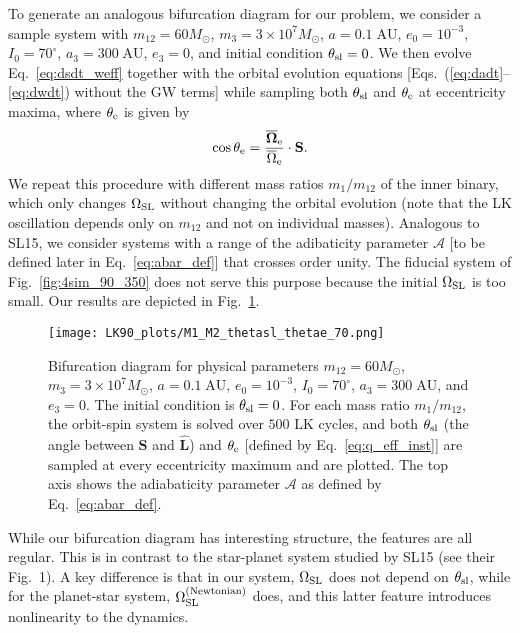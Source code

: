 \documentclass[
        twocolumn,
        twocolappendix
    ]{aastex63}
\renewcommand*{\bm}[1]{\boldsymbol{\mathbf{#1}}}
\newcommand*{\uv}[1]{\hat{\bm{#1}}}
\begin{document}
To generate an analogous bifurcation diagram for our problem, we
consider a sample system with $m_{12} = 60M_{\odot}$, $m_3 = 3 \times 10^7
M_{\odot}$, $a = 0.1\;\mathrm{AU}$, $e_0 = 10^{-3}$, $I_0 = 70^\circ$, $a_3 =
300\;\mathrm{AU}$, $e_3 = 0$, and initial condition $\theta_{\rm sl} = 0$.
We then evolve Eq.~\eqref{eq:dsdt_weff} together with the orbital evolution
equations [Eqs.~(\ref{eq:dadt}--\ref{eq:dwdt}) without the GW terms] while
sampling both $\theta_{\rm sl}$ and $\theta_{\rm e}$ at eccentricity maxima,
where $\theta_{\rm e}$ is given by
\begin{equation}
    \cos \theta_{\rm e} = \frac{\bm{\overline{\Omega}}_{\rm e}}{
        \overline{\Omega}_{\rm e}}\cdot \bm{S}.\label{eq:q_eff_inst}
\end{equation}
We repeat this procedure with different mass ratios $m_1 / m_{12}$ of the inner
binary, which only changes $\Omega_{\rm SL}$ without changing the orbital
evolution (note that the LK oscillation depends only on $m_{12}$ and not on
individual masses). Analogous to SL15, we consider systems with a range of the
adibaticity parameter $\mathcal{A}$ [to be defined later in
Eq.~\eqref{eq:abar_def}] that crosses order unity. The fiducial system of
Fig.~\ref{fig:4sim_90_350} does not serve this purpose because the initial
$\Omega_{\rm SL}$ is too small. Our results are depicted in
Fig.~\ref{fig:bifurcation_70}.
\begin{figure}
    \centering
    \texttt{[image: LK90\_plots/M1\_M2\_thetasl\_thetae\_70.png]}
    \caption{Bifurcation diagram for physical parameters $m_{12} = 60M_{\odot}$,
    $m_3 = 3 \times 10^7 M_{\odot}$, $a = 0.1\;\mathrm{AU}$, $e_0 = 10^{-3}$,
    $I_0 = 70^\circ$, $a_3 = 300\;\mathrm{AU}$, and $e_3 = 0$. The initial
    condition is $\theta_{\rm sl} = 0$. For each mass ratio $m_1 / m_{12}$, the
    orbit-spin system is solved over $500$ LK cycles, and both $\theta_{\rm sl}$
    (the angle between $\bm{S}$ and $\uv{L}$) and $\theta_{\rm e}$ [defined by
    Eq.~\eqref{eq:q_eff_inst}] are sampled at every eccentricity maximum and are
    plotted. The top axis shows the adiabaticity parameter $\mathcal{A}$ as
    defined by Eq.~\eqref{eq:abar_def}.}\label{fig:bifurcation_70}
\end{figure}

While our bifurcation diagram has interesting structure, the features are all
regular. This is in contrast to the star-planet system studied by SL15 (see
their Fig.~1). A key difference is that in our system, $\Omega_{\rm SL}$ does
not depend on $\theta_{\rm sl}$, while for the planet-star system, $\Omega_{\rm
SL}^{\rm (Newtonian)}$ does, and this latter feature introduces nonlinearity to
the dynamics.
\end{document}

